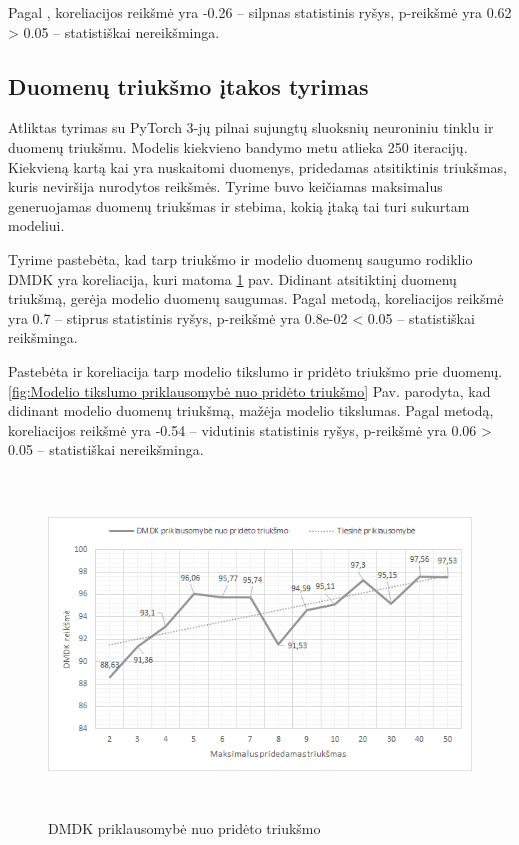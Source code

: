 \documentclass{VUMIFInfBakalaurinis}
\begin{document}
\par Pagal , koreliacijos reikšmė yra -0.26 -- silpnas statistinis ryšys, p-reikšmė yra 0.62 > 0.05 -- statistiškai nereikšminga.

\subsection{Duomenų triukšmo įtakos tyrimas}

\par Atliktas tyrimas su PyTorch 3-jų pilnai sujungtų sluoksnių neuroniniu tinklu ir duomenų triukšmu. Modelis kiekvieno bandymo metu atlieka 250 iteracijų. Kiekvieną kartą kai yra nuskaitomi duomenys, pridedamas atsitiktinis triukšmas, kuris neviršija nurodytos reikšmės. Tyrime buvo keičiamas maksimalus generuojamas duomenų triukšmas ir stebima, kokią įtaką tai turi sukurtam modeliui.
\par Tyrime pastebėta, kad tarp triukšmo ir modelio duomenų saugumo rodiklio DMDK yra koreliacija, kuri matoma \ref{fig:DMDK priklausomybė nuo pridėto triukšmo} pav. Didinant atsitiktinį duomenų triukšmą, gerėja modelio duomenų saugumas. Pagal  metodą, koreliacijos reikšmė yra 0.7 -- stiprus statistinis ryšys, p-reikšmė yra 0.8e-02 < 0.05 -- statistiškai reikšminga.

\par Pastebėta ir koreliacija tarp modelio tikslumo ir pridėto triukšmo prie duomenų. \ref{fig:Modelio tikslumo priklausomybė nuo pridėto triukšmo} Pav. parodyta, kad didinant modelio duomenų triukšmą, mažėja modelio tikslumas. Pagal  metodą, koreliacijos reikšmė yra -0.54 -- vidutinis statistinis ryšys, p-reikšmė yra 0.06 > 0.05 -- statistiškai nereikšminga.

\begin{figure}[h]
  \centering
  \includegraphics[width=13cm,height=9cm,keepaspectratio]{img/tr_tyr_dmdk.png}
  \caption{DMDK priklausomybė nuo pridėto triukšmo}
  \label{fig:DMDK priklausomybė nuo pridėto triukšmo}
\end{figure}
\clearpage
\end{document}
